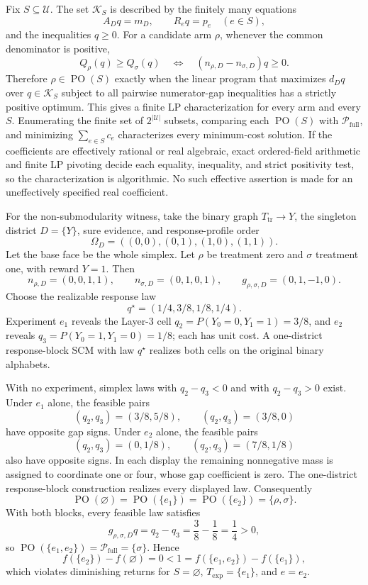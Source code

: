 Fix \(S\subseteq\mathcal U\). The set \(\mathcal K_S\) is described by the finitely many equations
\[
A_Dq=m_D,
\qquad R_eq=p_e\quad(e\in S),
\]
and the inequalities \(q\geq0\). For a candidate arm \(\rho\), whenever the common denominator is positive,
\[
Q_\rho(q)\geq Q_\sigma(q)
\quad\Longleftrightarrow\quad
(n_{\rho,D}-n_{\sigma,D})q\geq0.
\]
Therefore \(\rho\in\operatorname{PO}(S)\) exactly when the linear program that maximizes \(d_Dq\) over \(q\in\mathcal K_S\) subject to all pairwise numerator-gap inequalities has a strictly positive optimum. This gives a finite LP characterization for every arm and every \(S\). Enumerating the finite set of \(2^{|\mathcal U|}\) subsets, comparing each \(\operatorname{PO}(S)\) with \(\mathcal P_{\mathrm{full}}\), and minimizing \(\sum_{e\in S}c_e\) characterizes every minimum-cost solution. If the coefficients are effectively rational or real algebraic, exact ordered-field arithmetic and finite LP pivoting decide each equality, inequality, and strict positivity test, so the characterization is algorithmic. No such effective assertion is made for an uneffectively specified real coefficient.

For the non-submodularity witness, take the binary graph \(T_{\mathrm{tr}}\to Y\), the singleton district \(D=\{Y\}\), sure evidence, and response-profile order
\[
\Omega_D=((0,0),(0,1),(1,0),(1,1)).
\]
Let the base face be the whole simplex. Let \(\rho\) be treatment zero and \(\sigma\) treatment one, with reward \(Y=1\). Then
\[
n_{\rho,D}=(0,0,1,1),
\qquad n_{\sigma,D}=(0,1,0,1),
\qquad g_{\rho,\sigma,D}=(0,1,-1,0).
\]
Choose the realizable response law
\[
q^\star=(1/4,3/8,1/8,1/4).
\]
Experiment \(e_1\) reveals the Layer-3 cell \(q_2=P(Y_0=0,Y_1=1)=3/8\), and \(e_2\) reveals \(q_3=P(Y_0=1,Y_1=0)=1/8\); each has unit cost. A one-district response-block SCM with law \(q^\star\) realizes both cells on the original binary alphabets.

With no experiment, simplex laws with \(q_2-q_3<0\) and with \(q_2-q_3>0\) exist. Under \(e_1\) alone, the feasible pairs
\[
(q_2,q_3)=(3/8,5/8),\qquad (q_2,q_3)=(3/8,0)
\]
have opposite gap signs. Under \(e_2\) alone, the feasible pairs
\[
(q_2,q_3)=(0,1/8),\qquad (q_2,q_3)=(7/8,1/8)
\]
also have opposite signs. In each display the remaining nonnegative mass is assigned to coordinate one or four, whose gap coefficient is zero. The one-district response-block construction realizes every displayed law. Consequently
\[
\operatorname{PO}(\varnothing)=\operatorname{PO}(\{e_1\})
=\operatorname{PO}(\{e_2\})=\{\rho,\sigma\}.
\]
With both blocks, every feasible law satisfies
\[
g_{\rho,\sigma,D}q=q_2-q_3=\frac38-\frac18=\frac14>0,
\]
so \(\operatorname{PO}(\{e_1,e_2\})=\mathcal P_{\mathrm{full}}=\{\sigma\}\). Hence
\[
f(\{e_2\})-f(\varnothing)=0
<1=f(\{e_1,e_2\})-f(\{e_1\}),
\]
which violates diminishing returns for \(S=\varnothing\), \(T_{\mathrm{exp}}=\{e_1\}\), and \(e=e_2\).

